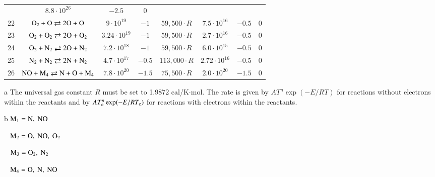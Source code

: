 \documentclass{warpdoc}
\begin{document}
\begin{table}[t]
\begin{center}
\begin{threeparttable}
\begin{tabular}{cccccccc}
                                          & $8.8 \cdot 10^{26}$  & $-2.5$  & 0\\
22 & $\rm O_2 + O \rightleftarrows 2O + O$ & $9 \cdot 10^{19}$ & $-1$ & $59,500\cdot R$ 
                                          & $7.5 \cdot 10^{16}$  & $-0.5$  & 0\\
23 & $\rm O_2 + O_2 \rightleftarrows 2O + O_2$ & $3.24 \cdot 10^{19}$ & $-1$ & $59,500\cdot R$ 
                                          & $2.7 \cdot 10^{16}$  & $-0.5$  & 0\\
24 & $\rm O_2 + N_2 \rightleftarrows 2O + N_2$ & $7.2 \cdot 10^{18}$ & $-1$ & $59,500\cdot R$ 
                                          & $6.0 \cdot 10^{15}$  & $-0.5$  & 0\\
25 & $\rm N_2 + N_2 \rightleftarrows 2N + N_2$ & $4.7 \cdot 10^{17}$ & $-0.5$ & $113,000\cdot R$ 
                                          & $2.72 \cdot 10^{16}$  & $-0.5$  & 0\\
26 & $\rm NO + M_4 \rightleftarrows N + O + M_4$ & $7.8 \cdot 10^{20}$ & $-1.5$ & $75,500\cdot R$ 
                                          & $2.0 \cdot 10^{20}$  & $-1.5$  & 0\\
\bottomrule
\end{tabular}
\begin{tablenotes}
\item[{a}] The universal gas constant $R$ must be set to 1.9872	cal/K$\cdot$mol. The rate is given by $A T^n \exp(-E/RT)$ for reactions without electrons within the reactants and by $A T_{\rm e}^n \exp(-E/RT_{\rm e})$ for reactions with electrons within the reactants.
\item[{b}] $\rm M_1=N,~NO$
\item[~] $\rm M_2=O,~NO,~O_2$
\item[~] $\rm M_3=O_2,~N_2$
\item[~] $\rm M_4=O,~N,~NO$
\end{tablenotes}
\label{tab:dunn-kang}
\end{threeparttable}
\end{center}
\end{table}
%
\end{document}
